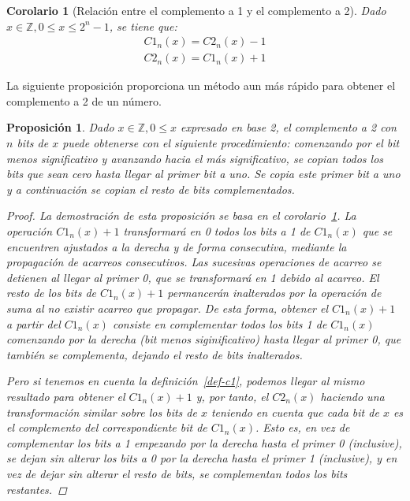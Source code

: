 \documentclass[spanish,a4paper,12pt,titlepage]{article}
\newtheorem{proposition}[theorem]{Proposición}
\newtheorem{corollary}[theorem]{Corolario}
\theoremstyle{definition}
\theoremstyle{remark}
\newcommand{\bbZ}{\mathbb{Z}}
\begin{document}
\begin{corollary}[Relación entre el complemento a 1 y el complemento a 2]\label{c1-c2-relation}
  Dado $x \in \bbZ, 0 \le x \le 2^n-1$, se tiene que:
  \begin{align*}
    C1_n(x) = C2_n(x) - 1\\
    C2_n(x) = C1_n(x) + 1
  \end{align*}
\end{corollary}

La siguiente proposición proporciona un método aun más rápido para obtener el complemento a 2 de un número.

\begin{proposition}
  Dado $x \in \bbZ, 0 \le x$ expresado en base 2, el complemento a 2 con $n$ bits de $x$ puede obtenerse con el siguiente procedimiento: comenzando por el bit menos significativo y avanzando hacia el más significativo, se copian todos los bits que sean cero hasta llegar al primer bit a uno. Se copia este primer bit a uno y a continuación se copian el resto de bits complementados.
  \begin{proof}
    La demostración de esta proposición se basa en el corolario~\ref{c1-c2-relation}. La operación $C1_n(x)+1$ transformará en 0 todos los bits a 1 de $C1_n(x)$ que se encuentren ajustados a la derecha y de forma consecutiva, mediante la propagación de acarreos consecutivos. Las sucesivas operaciones de acarreo se detienen al llegar al primer 0, que se transformará en 1 debido al acarreo. El resto de los bits de $C1_n(x)+1$ permancerán inalterados por la operación de suma al no existir acarreo que propagar. De esta forma, obtener el $C1_n(x)+1$ a partir del $C1_n(x)$ consiste en complementar todos los bits 1 de $C1_n(x)$ comenzando por la derecha (bit menos siginificativo) hasta llegar al primer 0, que también se complementa, dejando el resto de bits inalterados.

    Pero si tenemos en cuenta la definición~\ref{def-c1}, podemos llegar al mismo resultado para obtener el $C1_n(x)+1$ y, por tanto, el $C2_n(x)$ haciendo una transformación similar sobre los bits de $x$ teniendo en cuenta que cada bit de $x$ es el complemento del correspondiente bit de $C1_n(x)$. Esto es, en vez de complementar los bits a 1 empezando por la derecha hasta el primer 0 (inclusive), se dejan sin alterar los bits a 0 por la derecha hasta el primer 1 (inclusive), y en vez de dejar sin alterar el resto de bits, se complementan todos los bits restantes.
  \end{proof}
\end{proposition}
\end{document}

